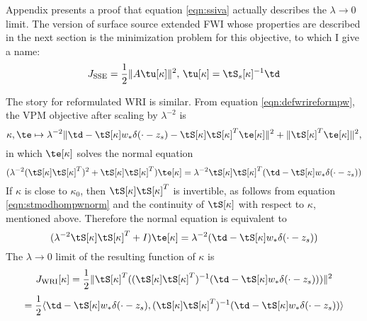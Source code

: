 Appendix \appIVA  presents a proof that equation \ref{eqn:ssiva}
actually describes the $\lambda \rightarrow 0$ limit. The version of
surface source extended FWI whose properties are described in the next
section is the minimization problem for this objective, to which I
give a name:
\begin{equation}
  \label{eqn:defssiva}
  J_{\rm SSE} = \frac{1}{2}\|A\tu[\kappa]\|^2, \,
  \tu[\kappa]=\tS_s[\kappa]^{-1}\td
\end{equation}

The story for reformulated WRI is similar. From equation
\ref{eqn:defwrireformpw}, the VPM objective after scaling by
$\lambda^{-2}$ is 
\begin{equation}
  \label{eqn:wrivpm}
  \kappa, \te \mapsto \lambda^{-2}\| \td -  \tS[\kappa]w_*\delta(\cdot-z_s) -
  \tS[\kappa]\tS[\kappa]^T\te[\kappa]\|^2+\|\tS[\kappa]^T\te[\kappa]\|^2,
\end{equation}
in which $\te[\kappa]$ solves the normal equation
\begin{equation}
  \label{eqn:wrinorm}
  (\lambda^{-2}(\tS[\kappa]\tS[\kappa]^T)^2 +
  \tS[\kappa]\tS[\kappa]^T)\te[\kappa] =
  \lambda^{-2}\tS[\kappa]\tS[\kappa]^T(\td -
  \tS[\kappa]w_*\delta(\cdot-z_s) )
\end{equation}
If $\kappa$ is close to $\kappa_0$, then $\tS[\kappa]\tS[\kappa]^T$ is
invertible, as follows from equation \ref{eqn:stmodhompwnorm} and the
continuity of $\tS[\kappa]$ with respect to $\kappa$, mentioned
above. Therefore the normal equation is equivalent to
\begin{equation}
  \label{eqn:wrinorm1}
  (\lambda^{-2}\tS[\kappa]\tS[\kappa]^T +
  I)\te[\kappa] =
  \lambda^{-2}(\td -
  \tS[\kappa]w_*\delta(\cdot-z_s) )
\end{equation}
The $\lambda \rightarrow 0$ limit of the resulting function of
$\kappa$ is
\[
  J_{\rm WRI}[\kappa] = \frac{1}{2}\|\tS[\kappa]^T((\tS[\kappa]\tS[\kappa]^T)^{-1}(\td -
  \tS[\kappa]w_*\delta(\cdot-z_s)))\|^2
\]
\begin{equation}
  \label{eqn:wripwiva}
  = \frac{1}{2}\langle \td -
  \tS[\kappa]w_*\delta(\cdot-z_s), (\tS[\kappa]\tS[\kappa]^T)^{-1}( \td -
  \tS[\kappa]w_*\delta(\cdot-z_s)) \rangle
\end{equation}

